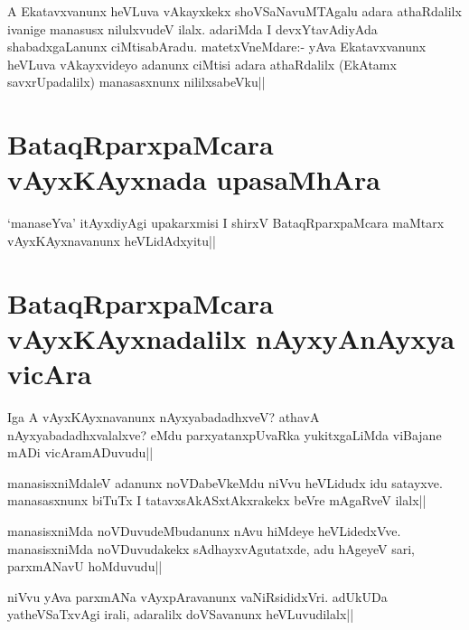
\begin{artha} 
A Ekatavxvanunx heVLuva vAkayxkekx shoVSaNavuMTAgalu adara athaRdalilx 
ivanige manasusx nilulxvudeV ilalx. adariMda I devxYtavAdiyAda 
shabadxgaLanunx ciMtisabAradu. matetxVneMdare:- yAva Ekatavxvanunx 
heVLuva vAkayxvideyo adanunx ciMtisi adara athaRdalilx (EkAtamx 
savxrUpadalilx) manasasxnunx nililxsabeVku||
\end{artha}

\section*{BataqRparxpaMcara vAyxKAyxnada upasaMhAra}

\begin{artha} 
`manaseYva' itAyxdiyAgi upakarxmisi I shirxV BataqRparxpaMcara maMtarx 
vAyxKAyxnavanunx heVLidAdxyitu||
\end{artha}

\section*{BataqRparxpaMcara vAyxKAyxnadalilx nAyxyAnAyxya vicAra}

\begin{artha} 
Iga A vAyxKAyxnavanunx nAyxyabadadhxveV? athavA nAyxyabadadhxvalalxve? 
eMdu parxyatanxpUvaRka yukitxgaLiMda viBajane mADi vicAramADuvudu||
\end{artha}


\begin{artha} 
manasisxniMdaleV adanunx noVDabeVkeMdu niVvu heVLidudx idu satayxve. 
manasasxnunx biTuTx I tatavxsAkASxtAkxrakekx beVre mAgaRveV ilalx||
\end{artha}

\begin{artha} 
manasisxniMda noVDuvudeMbudanunx nAvu hiMdeye heVLidedxVve. 
manasisxniMda noVDuvudakekx sAdhayxvAgutatxde, adu hAgeyeV sari, 
parxmANavU hoMduvudu||
\end{artha}


\begin{artha} 
niVvu yAva parxmANa vAyxpAravanunx vaNiRsididxVri. adUkUDa 
yatheVSaTxvAgi irali, adaralilx doVSavanunx heVLuvudilalx||
\end{artha}

